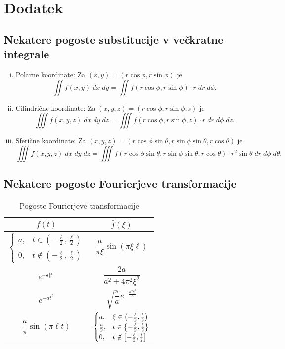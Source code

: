 \section{Dodatek}

\renewcommand{\thesubsection}{\Alph{subsection}}
\renewcommand{\arraystretch}{2.5}

\subsection{Nekatere pogoste substitucije v večkratne integrale}

\begin{enumerate}[i)]
\item Polarne koordinate:
Za $(x, y) = (r\cos\phi, r\sin\phi)$ je
\[
\iint f(x, y)\;dx\;dy =
\iint f(r\cos\phi, r\sin\phi) \cdot r\;dr\;d\phi.
\]
\item Cilindrične koordinate:
Za $(x, y, z) = (r\cos\phi, r\sin\phi, z)$ je
\[
\iiint f(x, y, z)\;dx\;dy\;dz =
\iiint f(r\cos\phi, r\sin\phi, z) \cdot r\;dr\;d\phi\;dz.
\]
\item Sferične koordinate:
Za $(x, y, z) =
(r\cos\phi\sin\theta, r\sin\phi\sin\theta, r\cos\theta)$
je
\[
\iiint f(x, y, z)\;dx\;dy\;dz =
\iiint f(r\cos\phi\sin\theta, r\sin\phi\sin\theta, r\cos\theta)
\cdot r^2 \sin \theta \;dr\;d\phi\;d\theta.
\]
\end{enumerate}

\newpage

\subsection{Nekatere pogoste Fourierjeve transformacije}

\begin{table}[!h]
\centering
\caption{Pogoste Fourierjeve transformacije}
\begin{tabular}{c|c}
$f(t)$ & $\hat{f}(\xi)$
\\ 
\hline 
$\displaystyle \begin{cases}
a, & t \in \left(-\frac{\ell}{2},\frac{\ell}{2}\right)
\\
0, & t \not\in \left(-\frac{\ell}{2},\frac{\ell}{2}\right)
\end{cases}$
&
$\dfrac{a}{\pi \xi} \sin(\pi \xi \ell)$
\\ 
\hline 
$e^{-a \left\lvert t\right\rvert}$
&
$\dfrac{2a}{a^2 + 4 \pi^2 \xi^2}$
\\ 
\hline 
$e^{-a t^2}$
&
$\sqrt{\dfrac{\pi}{a}} e^{-\frac{\pi^2 \xi^2}{a}}$
\\ 
\hline 
$\dfrac{a}{\pi} \sin(\pi \ell t)$
&
$\begin{cases}
a, & \xi \in \left(-\frac{\ell}{2},\frac{\ell}{2}\right)
\\
\frac{a}{2}, & t \in \left\{-\frac{\ell}{2},\frac{\ell}{2}\right\}
\\
0, & t \not\in \left[-\frac{\ell}{2},\frac{\ell}{2}\right]
\end{cases}$
\end{tabular} 
\end{table}
